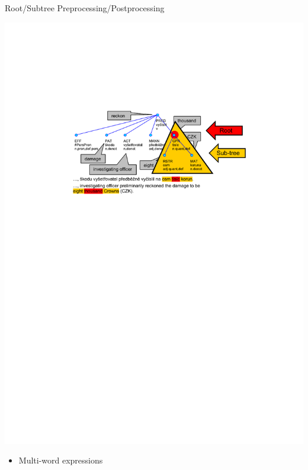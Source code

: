 \documentclass[xcolor=dvipsnames]{beamer}
\begin{document}
\begin{frame}{Root/Subtree Preprocessing/Postprocessing}
\centerline{\includegraphics[width=\hsize]{img/tree-subtree}}
\bigskip
\begin{itemize}
	\item Multi-word expressions
\end{itemize}
\end{frame}
\end{document}
